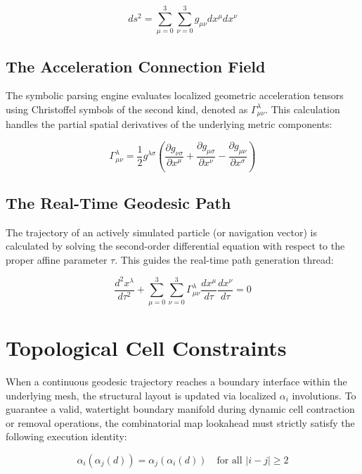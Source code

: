 \[
ds^2 = \sum_{\mu=0}^{3} \sum_{\nu=0}^{3} g_{\mu\nu} dx^\mu dx^\nu
\]

\subsection{The Acceleration Connection Field}
The symbolic parsing engine evaluates localized geometric acceleration tensors using Christoffel symbols of the second kind, denoted as $\Gamma^\lambda_{\mu\nu}$. This calculation handles the partial spatial derivatives of the underlying metric components:

\[
\Gamma^\lambda_{\mu\nu} = \frac{1}{2} g^{\lambda\sigma} \left( \frac{\partial g_{\nu\sigma}}{\partial x^\mu} + \frac{\partial g_{\mu\sigma}}{\partial x^\nu} - \frac{\partial g_{\mu\nu}}{\partial x^\sigma} \right)
\]

\subsection{The Real-Time Geodesic Path}
The trajectory of an actively simulated particle (or navigation vector) is calculated by solving the second-order differential equation with respect to the proper affine parameter $\tau$. This guides the real-time path generation thread:

\[
\frac{d^2 x^\lambda}{d\tau^2} + \sum_{\mu=0}^{3} \sum_{\nu=0}^{3} \Gamma^\lambda_{\mu\nu} \frac{dx^\mu}{d\tau} \frac{dx^\nu}{d\tau} = 0
\]

\section{Topological Cell Constraints}
When a continuous geodesic trajectory reaches a boundary interface within the underlying mesh, the structural layout is updated via localized $\alpha_i$ involutions. To guarantee a valid, watertight boundary manifold during dynamic cell contraction or removal operations, the combinatorial map lookahead must strictly satisfy the following execution identity:

\[
\alpha_i(\alpha_j(d)) = \alpha_j(\alpha_i(d)) \quad \text{for all } |i - j| \geq 2
\]




